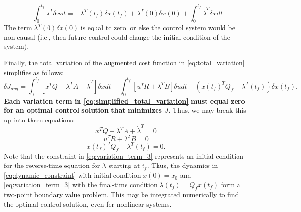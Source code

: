 \documentclass[a4 paper]{article}
\begin{document}
\begin{equation}
    -\int_{0}^{t_f} \lambda^T \delta \dot{x} dt = -\lambda^T (t_f) \delta x(t_f) + \lambda^T (0) \delta x(0) + 
    \int_{0}^{t_f} \dot{\lambda}^T \delta x dt.
\label{eq:integration_by_parts}
\end{equation}
The term \( \lambda^T (0) \delta x(0) \) is equal to zero, or else the control system would be non-causal 
(i.e., then future control could change the initial condition of the system).

\bigbreak

Finally, the total variation of the augmented cost function in \ref{eq:total_variation} simplifies as follows:
\begin{equation}
    \delta J_{aug} = \int_{0}^{t_f} \left[ x^T Q + \lambda^T A + \dot{\lambda}^T \right] \delta x dt + 
    \int_{0}^{t_f} \left[ u^T R + \lambda^T B \right] \delta u dt + (x(t_f)^T Q_f - \lambda^T (t_f)) \delta x(t_f).
\label{eq:simplified_total_variation}
\end{equation}
\textbf{Each variation term in \ref{eq:simplified_total_variation} must equal zero for an optimal control solution that minimizes \( J \).} 
Thus, we may break this up into three equations:
\begin{equation}
    x^T Q + \lambda^T A + \dot{\lambda}^T = 0
\label{eq:variation_term_1}
\end{equation}
\begin{equation}
    u^T R + \lambda^T B = 0
\label{eq:variation_term_2}
\end{equation}
\begin{equation}
    x(t_f)^T Q_f - \lambda^T (t_f) = 0. 
\label{eq:variation_term_3}
\end{equation}
Note that the constraint in \ref{eq:variation_term_3} represents an initial condition for the reverse-time equation for 
\( \lambda \) starting at \( t_f \). Thus, the dynamics in \ref{eq:dynamic_constraint} with initial condition \( x(0) = x_0 \) 
and \ref{eq:variation_term_3} with the final-time condition \( \lambda (t_f) = Q_f x(t_f) \) form a two-point boundary value problem. 
This may be integrated numerically to find the optimal control solution, even for nonlinear systems.

\bigbreak
\end{document}
